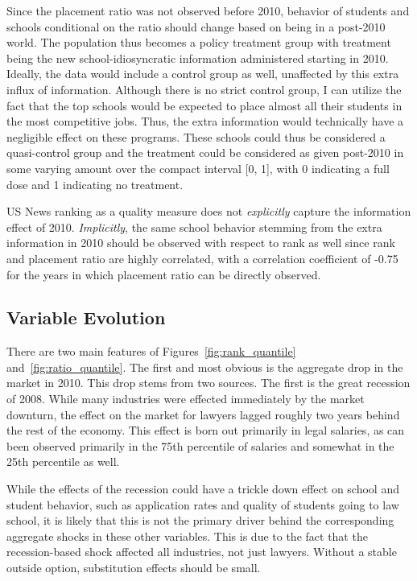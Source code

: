 \documentclass[12pt]{article}
\theoremstyle{definition}
\begin{document}
Since the placement ratio was not observed before 2010, behavior of students and schools conditional on the ratio should change based on being in a post-2010 world. The population thus becomes a policy treatment group with treatment being the new school-idiosyncratic information administered starting in 2010. Ideally, the data would include a control group as well, unaffected by this extra influx of information. Although there is no strict control group, I can utilize the fact that the top schools would be expected to place almost all their students in the most competitive jobs. Thus, the extra information would technically have a negligible effect on these programs. These schools could thus be considered a quasi-control group and the treatment could be considered as given post-2010 in some varying amount over the compact interval [0, 1], with 0 indicating a full dose and 1 indicating no treatment.

US News ranking as a quality measure does not \emph{explicitly} capture the information effect of 2010. \emph{Implicitly}, the same school behavior stemming from the extra information in 2010 should be observed with respect to rank as well since rank and placement ratio are highly correlated, with a correlation coefficient of -0.75 for the years in which placement ratio can be directly observed.

\subsection{Variable Evolution}

There are two main features of Figures~\ref{fig:rank_quantile} and~\ref{fig:ratio_quantile}. The first and most obvious is the aggregate drop in the market in 2010. This drop stems from two sources. The first is the great recession of 2008. While many industries were effected immediately by the market downturn, the effect on the market for lawyers lagged roughly two years behind the rest of the economy. This effect is born out primarily in legal salaries, as can been observed primarily in the 75th percentile of salaries and somewhat in the 25th percentile as well.

While the effects of the recession could have a trickle down effect on school and student behavior, such as application rates and quality of students going to law school, it is likely that this is not the primary driver behind the corresponding aggregate shocks in these other variables. This is due to the fact that the recession-based shock affected all industries, not just lawyers. Without a stable outside option, substitution effects should be small.
\end{document}
